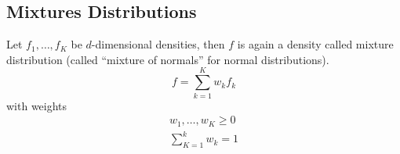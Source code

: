\subsection{Mixtures Distributions}
Let $f_1,\dots, f_K$ be $d$-dimensional densities, then $f$ is again a density called mixture distribution (called ``mixture of normals'' for normal distributions).
\begin{equation*}
    f = \sum_{k=1}^{K} w_k f_k 
\end{equation*}
with weights
\begin{gather*}
    w_1, \ldots, w_K \geq 0 \\
    \sum_{K=1}^{k}w_k = 1
\end{gather*}
